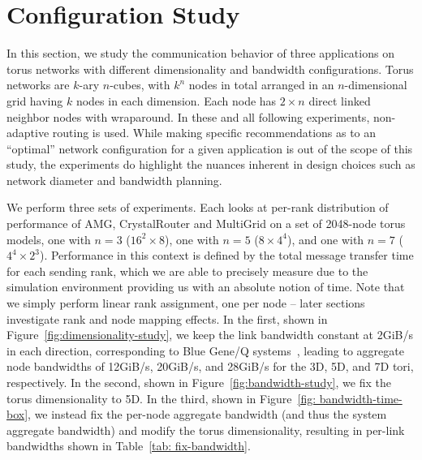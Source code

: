 \documentclass[conference]{IEEEtran}
\begin{document}
\section{Configuration Study}
\label{sec:config study}

In this section, we study the communication behavior of three applications on torus networks with different dimensionality and bandwidth configurations. Torus networks are $k$-ary $n$-cubes, with $k^{n}$ nodes in total arranged in an $n$-dimensional grid having $k$ nodes in each dimension. Each node has $2\times n$ direct linked neighbor nodes with wraparound. In these and all following experiments, non-adaptive routing is used. While making specific recommendations as to an ``optimal'' network configuration for a given application is out of the scope of this study, the experiments do highlight the nuances inherent in design choices such as network diameter and bandwidth planning.

We perform three sets of experiments. Each looks at per-rank distribution of performance of AMG, CrystalRouter and MultiGrid on a set of 2048-node torus models, one with $n=3$ ($16^{2} \times 8$), one with $n=5$ ($8\times 4^{4}$), and one with $n=7$ ($4^{4} \times 2^{3}$). Performance in this context is defined by the total message transfer time for each sending rank, which we are able to precisely measure due to the simulation environment providing us with an absolute notion of time. Note that we simply perform linear rank assignment, one per node -- later sections investigate rank and node mapping effects. In the first, shown in Figure~\ref{fig:dimensionality-study}, we keep the link bandwidth constant at 2GiB/s in each direction, corresponding to Blue Gene/Q systems~\cite{bgq}, leading to aggregate node bandwidths of 12GiB/s, 20GiB/s, and 28GiB/s for the 3D, 5D, and 7D tori, respectively. In the second, shown in Figure~\ref{fig:bandwidth-study}, we fix the torus dimensionality to 5D. In the third, shown in Figure~\ref{fig: bandwidth-time-box}, we instead fix the per-node aggregate bandwidth (and thus the system aggregate bandwidth) and modify the torus dimensionality, resulting in per-link bandwidths shown in Table~\ref{tab: fix-bandwidth}.
\end{document}
